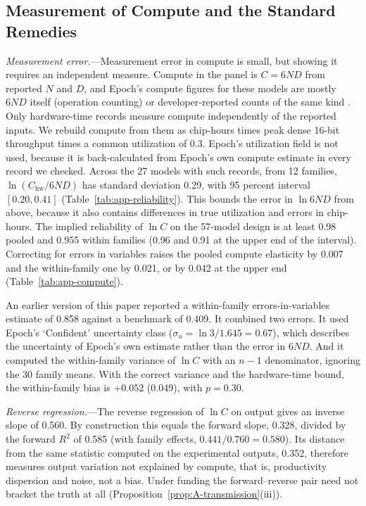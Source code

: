 \subsection{Measurement of Compute and the Standard Remedies}\label{app:obs-compute}

\emph{Measurement error.}---Measurement error in compute is small, but showing it requires an independent measure.
Compute in the panel is $C=6ND$ from reported $N$ and $D$, and Epoch's compute figures for these models are mostly
$6ND$ itself (operation counting) or developer-reported counts of the same kind \citep{epochai2026data}. Only
hardware-time records measure compute independently of the reported inputs. We rebuild compute from them as chip-hours
times peak dense 16-bit throughput times a common utilization of 0.3. Epoch's utilization field is not used, because it
is back-calculated from Epoch's own compute estimate in every record we checked. Across the 27 models with such records, from 12 families,
$\ln(C_{\text{hw}}/6ND)$ has standard deviation 0.29, with 95 percent interval $[0.20,0.41]$
(Table~\ref{tab:app-reliability}). This bounds the error in $\ln6ND$ from above, because it also contains differences
in true utilization and errors in chip-hours. The implied reliability of $\ln C$ on the 57-model design is at least
0.98 pooled and 0.955 within families (0.96 and 0.91 at the upper end of the interval). Correcting for errors in
variables raises the pooled compute elasticity by 0.007 and the within-family one by 0.021, or by 0.042 at the upper
end (Table~\ref{tab:app-compute}).



An earlier version of this paper reported a within-family errors-in-variables estimate of 0.858 against a benchmark of
0.409. It combined two errors. It used Epoch's `Confident' uncertainty class ($\sigma_u=\ln3/1.645=0.67$), which
describes the uncertainty of Epoch's own estimate rather than the error in $6ND$. And it computed the within-family
variance of $\ln C$ with an $n-1$ denominator, ignoring the 30 family means. With the correct variance and the
hardware-time bound, the within-family bias is $+0.052$ (0.049), with $p=0.30$.

\emph{Reverse regression.}---The reverse regression of $\ln C$ on output gives an inverse slope of 0.560. By
construction this equals the forward slope, 0.328, divided by the forward $R^2$ of 0.585 (with family effects,
$0.441/0.760=0.580$). Its distance from the same statistic computed on the experimental outputs, 0.352, therefore
measures output variation not explained by compute, that is, productivity dispersion and noise, not a bias. Under
funding the forward--reverse pair need not bracket the truth at all (Proposition~\ref{prop:A-transmission}(iii)).

